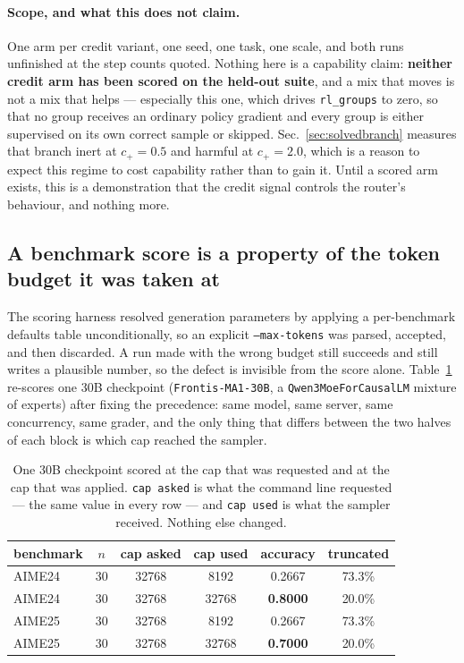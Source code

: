 \paragraph{Scope, and what this does not claim.} One arm per credit variant, one seed, one
task, one scale, and both runs unfinished at the step counts quoted. Nothing here is a
capability claim: \textbf{neither credit arm has been scored on the
held-out suite}, and a mix that moves is not a mix that helps --- especially this one, which
drives \texttt{rl\_groups} to zero, so that no group receives an ordinary policy gradient and
every group is either supervised on its own correct sample or skipped. Sec.~\ref{sec:solvedbranch}
measures that branch inert at $c_+=0.5$ and harmful at $c_+=2.0$, which is a reason to expect
this regime to cost capability rather than to gain it. Until a scored arm exists, this is a
demonstration that the credit signal controls the router's behaviour, and nothing more.

\subsection{A benchmark score is a property of the token budget it was taken at}
\label{sec:cap}

The scoring harness resolved generation parameters by applying a per-benchmark defaults table
unconditionally, so an explicit \texttt{--max-tokens} was parsed, accepted, and then
discarded. A run made with the wrong budget still succeeds and still writes a plausible
number, so the defect is invisible from the score alone. Table~\ref{tab:cap} re-scores one
30B checkpoint (\texttt{Frontis-MA1-30B}, a \texttt{Qwen3MoeForCausalLM} mixture of experts)
after fixing the precedence: same model, same server, same concurrency, same grader, and the
only thing that differs between the two halves of each block is which cap reached the sampler.

\begin{table}[t]
\centering\small
\caption{One 30B checkpoint scored at the cap that was requested and at the cap that was
applied. \texttt{cap asked} is what the command line requested --- the same value in every
row --- and \texttt{cap used} is what the sampler received. Nothing else changed.}
\label{tab:cap}
\begin{tabular}{lccccc}
\toprule
benchmark & $n$ & cap asked & cap used & accuracy & truncated \\
\midrule
AIME24 & 30 & 32768 & 8192  & 0.2667 & 73.3\% \\
AIME24 & 30 & 32768 & 32768 & \textbf{0.8000} & 20.0\% \\
\midrule
AIME25 & 30 & 32768 & 8192  & 0.2667 & 73.3\% \\
AIME25 & 30 & 32768 & 32768 & \textbf{0.7000} & 20.0\% \\
\bottomrule
\end{tabular}
\end{table}

